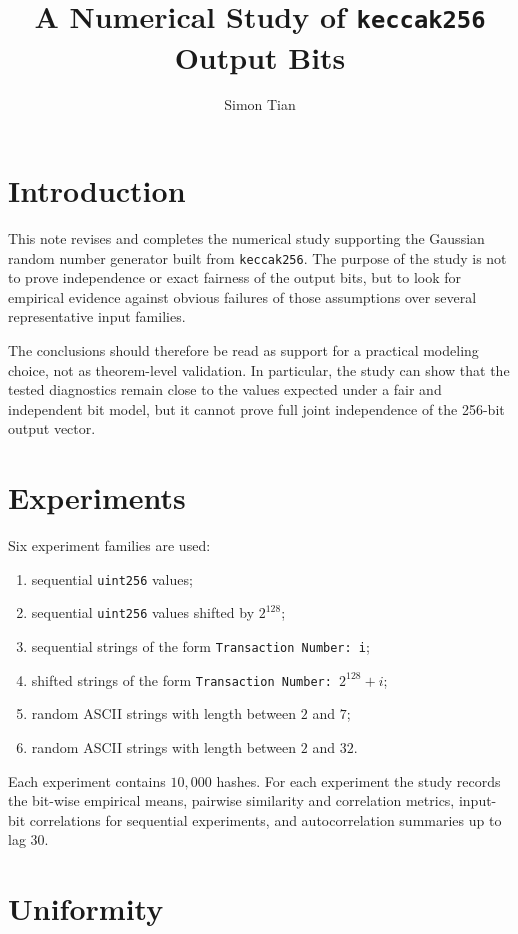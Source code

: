 \documentclass[11pt]{article}
\title{A Numerical Study of \texttt{keccak256} Output Bits}
\author{Simon Tian}
\date{}
\begin{document}
\maketitle

\section{Introduction}

This note revises and completes the numerical study supporting the Gaussian
random number generator built from \texttt{keccak256}. The purpose of the study
is not to prove independence or exact fairness of the output bits, but to look
for empirical evidence against obvious failures of those assumptions over several
representative input families.

The conclusions should therefore be read as support for a practical modeling
choice, not as theorem-level validation. In particular, the study can show that
the tested diagnostics remain close to the values expected under a fair and
independent bit model, but it cannot prove full joint independence of the
256-bit output vector.

\section{Experiments}

Six experiment families are used:

\begin{enumerate}
\item sequential \texttt{uint256} values;
\item sequential \texttt{uint256} values shifted by $2^{128}$;
\item sequential strings of the form \texttt{Transaction Number: i};
\item shifted strings of the form \texttt{Transaction Number: }$2^{128}+i$;
\item random ASCII strings with length between $2$ and $7$;
\item random ASCII strings with length between $2$ and $32$.
\end{enumerate}

Each experiment contains $10{,}000$ hashes. For each experiment the study
records the bit-wise empirical means, pairwise similarity and correlation
metrics, input-bit correlations for sequential experiments, and autocorrelation
summaries up to lag $30$.

\section{Uniformity}
\end{document}
